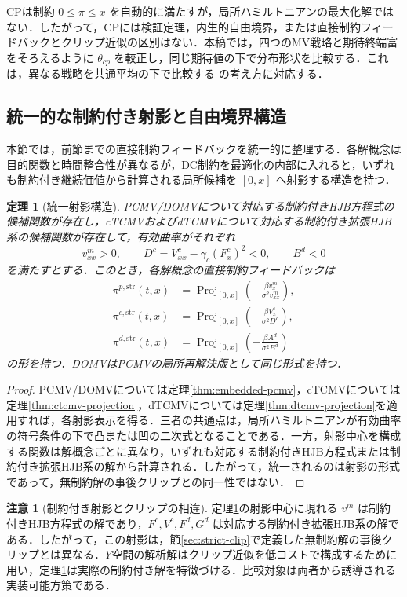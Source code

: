 \documentclass[10pt,a4paper]{article}
\theoremstyle{plain}
\newtheorem{theorem}{定理}
\theoremstyle{definition}
\newtheorem{remark}{注意}
\DeclareMathOperator{\Proj}{Proj}
\begin{document}
CPは制約 $0\leq\pi\leq x$ を自動的に満たすが，局所ハミルトニアンの最大化解ではない．したがって，CPには検証定理，内生的自由境界，または直接制約フィードバックとクリップ近似の区別はない．本稿では，四つのMV戦略と期待終端富をそろえるように $\theta_{cp}$ を較正し，同じ期待値の下で分布形状を比較する．これは，異なる戦略を共通平均の下で比較する \citet{vanStadenDangForsyth2021} の考え方に対応する．

\subsection{統一的な制約付き射影と自由境界構造}
\label{sec:unified}

本節では，前節までの直接制約フィードバックを統一的に整理する．各解概念は目的関数と時間整合性が異なるが，DC制約を最適化の内部に入れると，いずれも制約付き継続価値から計算される局所候補を $[0,x]$ へ射影する構造を持つ．

\begin{theorem}[統一射影構造]
\label{thm:unified}
PCMV/DOMVについて対応する制約付きHJB方程式の候補関数が存在し，cTCMVおよびdTCMVについて対応する制約付き拡張HJB系の候補関数が存在して，有効曲率がそれぞれ
\[
  v_{xx}^m>0,
  \qquad
  D^c=V_{xx}^c-\gamma_c(F_x^c)^2<0,
  \qquad
  B^d<0
\]
を満たすとする．このとき，各解概念の直接制約フィードバックは
\begin{align*}
  \pi^{p,\mathrm{str}}(t,x)&=\Proj_{[0,x]}
  \left(-\frac{\beta v_x^m}{\sigma^2v_{xx}^m}\right),\\
  \pi^{c,\mathrm{str}}(t,x)&=\Proj_{[0,x]}
  \left(-\frac{\beta V_x^c}{\sigma^2D^c}\right),\\
  \pi^{d,\mathrm{str}}(t,x)&=\Proj_{[0,x]}
  \left(-\frac{\beta A^d}{\sigma^2B^d}\right)
\end{align*}
の形を持つ．DOMVはPCMVの局所再解決版として同じ形式を持つ．
\end{theorem}

\begin{proof}
PCMV/DOMVについては定理\ref{thm:embedded-pcmv}，cTCMVについては定理\ref{thm:ctcmv-projection}，dTCMVについては定理\ref{thm:dtcmv-projection}を適用すれば，各射影表示を得る．三者の共通点は，局所ハミルトニアンが有効曲率の符号条件の下で凸または凹の二次式となることである．一方，射影中心を構成する関数は解概念ごとに異なり，いずれも対応する制約付きHJB方程式または制約付き拡張HJB系の解から計算される．したがって，統一されるのは射影の形式であって，無制約解の事後クリップとの同一性ではない．
\end{proof}

\begin{remark}[制約付き射影とクリップの相違]
定理\ref{thm:unified}の射影中心に現れる $v^m$ は制約付きHJB方程式の解であり，$F^c,V^c,F^d,G^d$ は対応する制約付き拡張HJB系の解である．したがって，この射影は，節\ref{sec:strict-clip}で定義した無制約解の事後クリップとは異なる．$Y$空間の解析解はクリップ近似を低コストで構成するために用い，定理\ref{thm:unified}は実際の制約付き解を特徴づける．比較対象は両者から誘導される実装可能方策である．
\end{remark}
\end{document}
